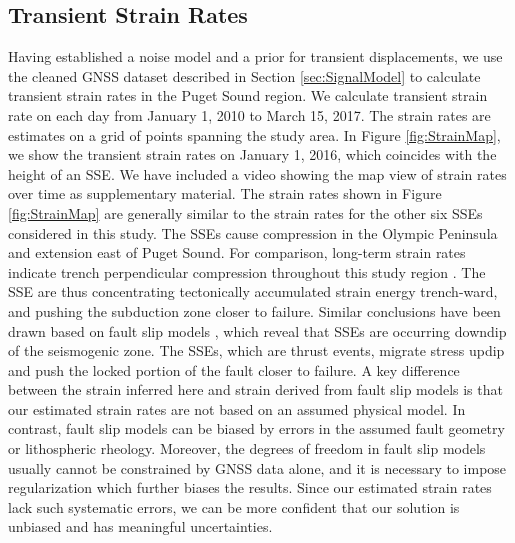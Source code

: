 \documentclass[10pt,a4paper]{article}
\begin{document}
\subsection{Transient Strain Rates} 
Having established a noise model and a prior for transient displacements, we use the cleaned GNSS dataset described in Section \ref{sec:SignalModel} to calculate transient strain rates in the Puget Sound region.  We calculate transient strain rate on each day from January 1, 2010 to March 15, 2017. The strain rates are estimates on a grid of points spanning the study area. In Figure \ref{fig:StrainMap}, we show the transient strain rates on January 1, 2016, which coincides with the height of an SSE. We have included a video showing the map view of strain rates over time as supplementary material. The strain rates shown in Figure \ref{fig:StrainMap} are generally similar to the strain rates for the other six SSEs considered in this study.  The SSEs cause compression in the Olympic Peninsula and extension east of Puget Sound. For comparison, long-term strain rates indicate trench perpendicular compression throughout this study region \citep{Murray2000,McCaffrey2007,McCaffrey2013}.  The SSE are thus concentrating tectonically accumulated strain energy trench-ward, and pushing the subduction zone closer to failure. Similar conclusions have been drawn based on fault slip models \citep[e.g.,][]{Dragert2001,Wech2009,Schmidt2010}, which reveal that SSEs are occurring downdip of the seismogenic zone. The SSEs, which are thrust events, migrate stress updip and push the locked portion of the fault closer to failure. A key difference between the strain inferred here and strain derived from fault slip models is that our estimated strain rates are not based on an assumed physical model. In contrast, fault slip models can be biased by errors in the assumed fault geometry or lithospheric rheology. Moreover, the degrees of freedom in fault slip models usually cannot be constrained by GNSS data alone, and it is necessary to impose regularization which further biases the results. Since our estimated strain rates lack such systematic errors, we can be more confident that our solution is unbiased and has meaningful uncertainties.  
\end{document}
